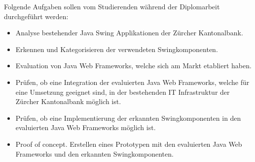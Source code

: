Folgende Aufgaben sollen vom Studierenden während der Diplomarbeit durchgeführt
werden:
    
\begin{itemize}
  \item Analyse bestehender Java Swing Applikationen der Zürcher Kantonalbank.
  \item Erkennen und Kategorisieren der verwendeten Swingkomponenten.
  \item Evaluation von Java Web Frameworks, welche sich am Markt etabliert
  haben.
  \item Prüfen, ob eine Integration der evaluierten Java Web Frameworks, welche
  für eine Umsetzung geeignet sind, in der bestehenden IT Infrastruktur der
  Zürcher Kantonalbank möglich ist.
  \item Prüfen, ob eine Implementierung der erkannten Swingkomponenten in den
  evaluierten Java Web Frameworks möglich ist.
  \item Proof of concept. Erstellen eines Prototypen mit den evaluierten Java
  Web Frameworks und den erkannten Swingkomponenten.
\end{itemize}